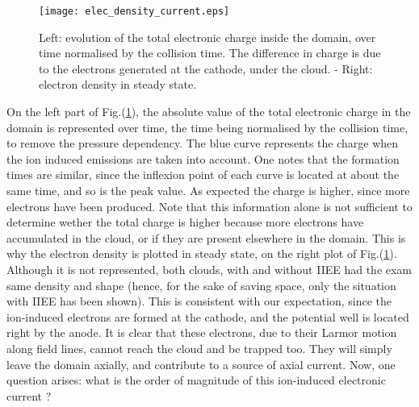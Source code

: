 \begin{figure}[h!]
\centering
	\texttt{[image: elec\_density\_current.eps]}
	\caption{\label{elec_density_current} Left: evolution of the total electronic charge inside the domain, over time normalised by the collision time. The difference in charge is due to the electrons generated at the cathode, under the cloud. - Right: electron density in steady state.}
\end{figure}  

On the left part of Fig.(\ref{elec_density_current}), the absolute value of the total electronic charge in the domain is represented over time, the time being normalised by the collision time, to remove the pressure dependency. The blue curve represents the charge when the ion induced emissions are taken into account. One notes that the formation times are similar, since the inflexion point of each curve is located at about the same time, and so is the peak value. As expected the charge is higher, since more electrons have been produced. Note that this information alone is not sufficient to determine wether the total charge is higher because more electrons have accumulated in the cloud, or if they are present elsewhere in the domain. This is why the electron density is plotted in steady state, on the right plot of Fig.(\ref{elec_density_current}). Although it is not represented, both clouds, with and without IIEE had the exam same density and shape (hence, for the sake of saving space, only the situation with IIEE has been shown). This is consistent with our expectation, since the ion-induced electrons are formed at the cathode, and the potential well is located right by the anode. It is clear that these electrons, due to their Larmor motion along field lines, cannot reach the cloud and be trapped too. They will simply leave the domain axially, and contribute to a source of axial current. Now, one question arises: what is the order of magnitude of this ion-induced electronic current ?\\ 

